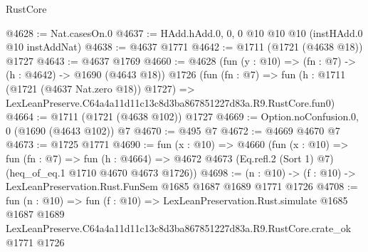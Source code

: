 \begin{lexlean}{RustCore}
\begin{coremodule}
@4628 := Nat.casesOn.{0}
@4637 := HAdd.hAdd.{0, 0, 0} @10 @10 @10 (instHAdd.{0} @10 instAddNat)
@4638 := @4637 @1771
@4642 := @1711 (@1721 (@4638 @18)) @1727
@4643 := @4637 @1769
@4660 := @4628
    (fun (y : @10) => (fn : @7) -> (h : @4642) -> @1690 (@4643 @18))
    @1726
    (fun (fn : @7) =>
    fun (h : @1711 (@1721 (@4637 Nat.zero @18)) @1727) =>
    LexLeanPreserve.C64a4a11d11c13c8d3ba867851227d83a.R9.RustCore.fun0)
@4664 := @1711 (@1721 (@4638 @102)) @1727
@4669 := Option.noConfusion.{0, 0} (@1690 (@4643 @102)) @7
@4670 := @495 @7
@4672 := @4669 @4670 @7
@4673 := @1725 @1771
@4690 := fun (x : @10) =>
  @4660
    (fun (x : @10) =>
    fun (fn : @7) =>
    fun (h : @4664) =>
    @4672 @4673 (Eq.refl.{2} (Sort 1) @7) (heq_of_eq.{1} @1710 @4670 @4673 @1726))
@4698 := (n : @10) -> (f : @10) -> LexLeanPreservation.Rust.FunSem @1685 @1687 @1689 @1771 @1726
@4708 := fun (n : @10) =>
  fun (f : @10) =>
  LexLeanPreservation.Rust.simulate
    @1685
    @1687
    @1689
    LexLeanPreserve.C64a4a11d11c13c8d3ba867851227d83a.R9.RustCore.crate_ok
    @1771
    @1726
\end{coremodule}
\end{lexlean}

